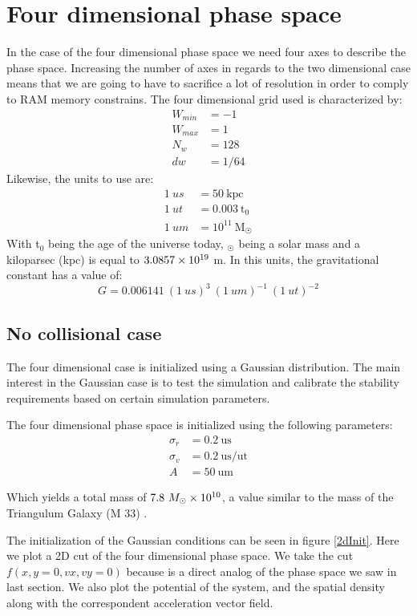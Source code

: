 {\section{Four dimensional phase space}
In the case of the four dimensional phase space we need four axes to describe the phase space. Increasing the number of axes in regards to the two dimensional case means that we are going to have to sacrifice a lot of resolution in order to comply to RAM memory constrains. The four dimensional grid used is characterized by:
\begin{align}
W_{min} &= -1\\
W_{max} &= 1\\
N_w &= 128\\
dw &= 1/64
\end{align}
Likewise, the units to use are:
\begin{align}
1\ us &= 50\ \text{kpc}\\
1\ ut &= 0.003 \ \text{t}_0\\
1\ um &= 10^{11} \ \text{M}_{\astrosun}
\end{align}
With t$_0$ being the age of the universe today, $_{\astrosun}$ being a solar mass and a kiloparsec (kpc) is equal to $3.0857\times 10^{19}$ m. In this units, the gravitational constant has a value of:
\begin{equation}
G = 0.006141 \ (1 \ us)^3 \ (1 \ um)^{-1} \ (1 \ ut)^{-2}
\end{equation}
\subsection{No collisional case}
The four dimensional case is initialized using a Gaussian distribution. The main interest in the Gaussian case is to test the simulation and calibrate the stability requirements based on certain simulation parameters. 

The four dimensional phase space is initialized using the following parameters:
\begin{align}
\sigma_r &= 0.2 \ \text{us} \\
\sigma_v &= 0.2 \ \text{us} / \text{ut} \\
A &= 50  \ \text{um}
\end{align}

Which yields a total mass of $7.8 \ M_{\odot} \e{10}$, a value similar to the mass of the Triangulum Galaxy (M 33) \cite{2003MNRAS342199C}.

The initialization of the Gaussian conditions can be seen in figure \ref{2dInit}. Here we plot a 2D cut of the four dimensional phase space. We take the cut $f(x,y=0,vx,vy=0)$ because is a direct analog of the phase space we saw in last section. We also plot the potential of the system, and the spatial density along with the correspondent acceleration vector field.


}
